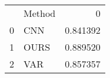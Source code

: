 \begin{tabular}{llr}
 & Method & 0 \\
0 & CNN & 0.841392 \\
1 & OURS & 0.889520 \\
2 & VAR & 0.857357 \\
\end{tabular}
